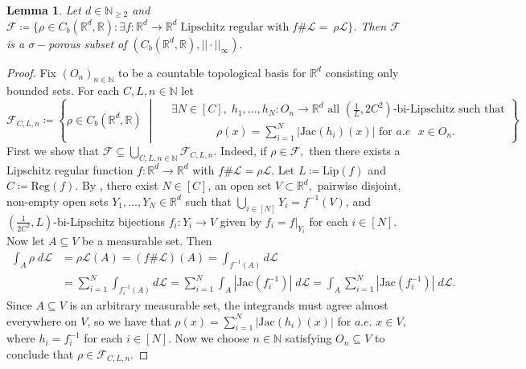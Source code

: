 \documentclass{article}
\newtheorem{lemma}[define]{Lemma}
\newcommand{\R}{\mathbb{R}}
\newcommand{\N}{\mathbb{N}}
\newcommand{\leb}{\mc{L}}
\newcommand{\mc}[1]{\mathcal{#1}}
\begin{document}
\begin{lemma} \label{lemma: porosity f}
     Let $d \in \N_{\geq 2}$ and $\mathcal{F} \coloneqq \{\rho \in C_b(\R^d,\R): \exists f:\R^d \to \R^d \;\text{Lipschitz regular with}\; f\#\leb =~\rho\leb\}$. Then $\mathcal{F}$ is a $\sigma-$porous subset of $(C_b(\R^d,\R),||\cdot||_{\infty}).$
\end{lemma}
\begin{proof}
     Fix $(O_n)_{n \in \N}$ to be a countable topological basis for $\R^d$ consisting only bounded sets. For each $C,L,n \in \N$ let 
    \begin{equation*}
 \mathcal{F}_{C,L,n} \coloneqq \left\{
  \rho\in C_b(\R^d,\R) \;\middle|\;
  \begin{aligned}
  & \exists N \in [C], \;h_1,...,h_N:O_n \to \R^d \text{ all }(\tfrac{1}{L},2C^2)\text{-bi-Lipschitz such that}\\
  &\qquad \qquad \rho(x) = \sum_{i=1}^N|\text{Jac}(h_i)(x)| \text{ for $a.e$ $x \in O_n$}.
  \end{aligned}
\right\}
\end{equation*}
First we show that $\mathcal{F} \subseteq \bigcup_{C,L,n \in \N}\mathcal{F}_{C,L,n}.$ Indeed, if $\rho \in \mathcal{F},$ then there exists a Lipschitz regular function $f:\R^d \to \R^d$ with $f\#\leb = \rho\leb.$ Let $L \coloneqq \text{Lip}(f)$ and $C \coloneqq \text{Reg}(f).$ By \cite[Proposition $2.15$]{dymond2018mapping}, there exist $N \in [C]$, an open set $V \subset \R^d,$ pairwise disjoint, non-empty open sets $Y_1,...,Y_N \in \R^d$ such that $\bigcup_{i \in [N]} Y_i = f^{-1}(V)$, and $(\frac{1}{2C^2},L)$-bi-Lipschitz bijections $f_i: Y_i \to V$ given by $f_i = f|_{Y_i}$ for each $i \in [N].$ Now let $A \subseteq V$ be a measurable set. Then
    \begin{equation*}
    \begin{split}
        \int_{A}\rho \; d \leb &= \rho \leb(A) = (f\#\leb)(A) = \int_{f^{-1}(A)}d \leb \\
        & = \sum_{i=1}^N \int_{f_{i}^{-1}(A)}d \leb  = \sum_{i=1}^N \int_{A}|\text{Jac}(f_i^{-1})| \; d \leb = \int_{A}\sum_{i=1}^N|\text{Jac}(f_i^{-1})| \; d \leb.
    \end{split}
\end{equation*}
Since $A \subseteq V$ is an arbitrary measurable set, the integrands must agree almost everywhere on $V$, so we have that $\rho(x) = \sum_{i=1}^N |\text{Jac}(h_i)(x)|$ for $a.e.$ $x \in V,$ where $h_i = f_i^{-1}$ for each $i \in [N].$ Now we choose $n \in \N$ satisfying $O_n \subseteq V$ to conclude that $\rho \in \mathcal{F}_{C,L,n}.$ 


\end{proof}
\end{document}
